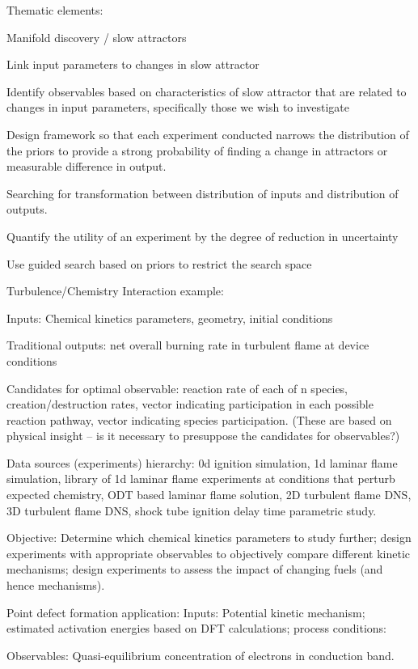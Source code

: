 \documentclass[11pt]{article}
\begin{document}
Thematic elements:

Manifold discovery / slow attractors

Link input parameters to changes in slow attractor

Identify observables based on characteristics of slow attractor that are related to changes in input parameters, specifically those we wish to investigate

Design framework so that each experiment conducted narrows the distribution of the priors to provide a strong probability of finding a change in attractors or measurable difference in output. 

Searching for transformation between distribution of inputs and distribution of outputs. 

Quantify the utility of an experiment by the degree of reduction in uncertainty

Use guided search based on priors to restrict the search space

Turbulence/Chemistry Interaction example:


Inputs: Chemical kinetics parameters, geometry, initial conditions

Traditional outputs: net overall burning rate in turbulent flame at device conditions

Candidates for optimal observable: reaction rate of each of n species, creation/destruction rates, vector indicating participation in each possible reaction pathway, vector indicating species participation.
(These are based on physical insight -- is it necessary to presuppose the candidates for observables?)
 
Data sources (experiments) hierarchy: 0d ignition simulation, 1d laminar flame simulation, library of 1d laminar flame experiments at conditions that perturb expected chemistry, ODT based laminar flame solution, 2D turbulent flame DNS, 3D turbulent flame DNS, shock tube ignition delay time parametric study.

Objective: Determine which chemical kinetics parameters to study further; design experiments with appropriate observables to objectively compare different kinetic mechanisms; design experiments to assess the impact of changing fuels (and hence mechanisms).

Point defect formation application:
Inputs: Potential kinetic mechanism; estimated activation energies based on DFT calculations; process conditions:

Observables: Quasi-equilibrium concentration of electrons in conduction band. 
\end{document}
